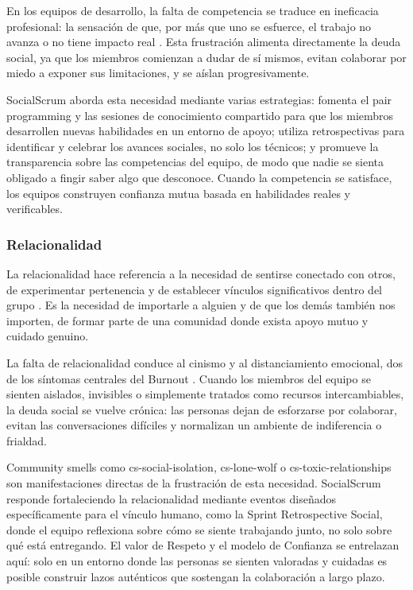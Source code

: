En los equipos de desarrollo, la falta de competencia se traduce en ineficacia profesional: la sensación de que, por más que uno se esfuerce, el trabajo no avanza o no tiene impacto real \cite{tulili2022burnout}. Esta frustración alimenta directamente la deuda social, ya que los miembros comienzan a dudar de sí mismos, evitan colaborar por miedo a exponer sus limitaciones, y se aíslan progresivamente.

SocialScrum aborda esta necesidad mediante varias estrategias: fomenta el pair programming y las sesiones de conocimiento compartido para que los miembros desarrollen nuevas habilidades en un entorno de apoyo; utiliza retrospectivas para identificar y celebrar los avances sociales, no solo los técnicos; y promueve la transparencia sobre las competencias del equipo, de modo que nadie se sienta obligado a fingir saber algo que desconoce. Cuando la competencia se satisface, los equipos construyen confianza mutua basada en habilidades reales y verificables.

\subsubsection{Relacionalidad}

La relacionalidad hace referencia a la necesidad de sentirse conectado con otros, de experimentar pertenencia y de establecer vínculos significativos dentro del grupo \cite{ryan_self-determination_2000}. Es la necesidad de importarle a alguien y de que los demás también nos importen, de formar parte de una comunidad donde exista apoyo mutuo y cuidado genuino.

La falta de relacionalidad conduce al cinismo y al distanciamiento emocional, dos de los síntomas centrales del Burnout \cite{tulili2022burnout}. Cuando los miembros del equipo se sienten aislados, invisibles o simplemente tratados como recursos intercambiables, la deuda social se vuelve crónica: las personas dejan de esforzarse por colaborar, evitan las conversaciones difíciles y normalizan un ambiente de indiferencia o frialdad.

Community smells como \gls{cs-social-isolation}, \gls{cs-lone-wolf} o \gls{cs-toxic-relationships} son manifestaciones directas de la frustración de esta necesidad. SocialScrum responde fortaleciendo la relacionalidad mediante eventos diseñados específicamente para el vínculo humano, como la Sprint Retrospective Social, donde el equipo reflexiona sobre cómo se siente trabajando junto, no solo sobre qué está entregando. El valor de Respeto y el modelo de Confianza se entrelazan aquí: solo en un entorno donde las personas se sienten valoradas y cuidadas es posible construir lazos auténticos que sostengan la colaboración a largo plazo.

